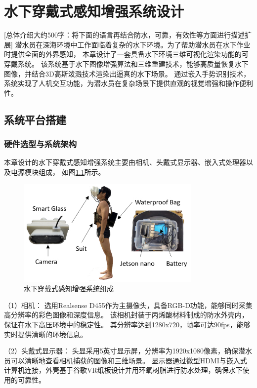 
\chapter{水下穿戴式感知增强系统设计}
[总体介绍大约500字：将下面的语言再结合防水，可靠，有效性等方面进行描述扩展]
潜水员在深海环境中工作面临着复杂的水下环境。为了帮助潜水员在水下作业时提供全面的外界感知，
本章设计了一套具备水下环境三维可视化渲染功能的可穿戴系统。
该系统基于水下图像增强算法和三维重建技术，能够高质量恢复水下图像，并结合3D高斯泼溅技术渲染出逼真的水下场景。
通过嵌入手势识别技术，系统实现了人机交互功能，为潜水员在复杂场景下提供直观的视觉增强和操作便利性。

\section{系统平台搭建} 
\subsection{硬件选型与系统架构}
本章设计的水下穿戴式感知增强系统主要由相机、头戴式显示器、嵌入式处理器以及电源模块组成，
如图\ref{img:system}所示。
\begin{figure}
    \centering
    \includegraphics[width=0.8\textwidth]{figures/ch5/architecture of system.jpg}
    \caption{水下穿戴式感知增强系统组成}
    \label{img:system}
\end{figure}

（1）相机：
选用Realsense D455作为主摄像头，具备RGB-D功能，能够同时采集高分辨率的彩色图像和深度信息。
该相机封装于丙烯酸材料制成的防水外壳内，保证在水下高压环境中的稳定性。
其分辨率达到1280x720，帧率可达90fps，能够实时提供清晰的环境信息。

（2）头戴式显示器：
头显采用5英寸显示屏，分辨率为1920x1080像素，确保潜水员可以清晰地查看相机捕获的图像和三维场景。
显示器通过微型HDMI与嵌入式计算机连接，外壳基于谷歌VR纸板设计并用环氧树脂进行防水处理，确保水下使用的可靠性。

